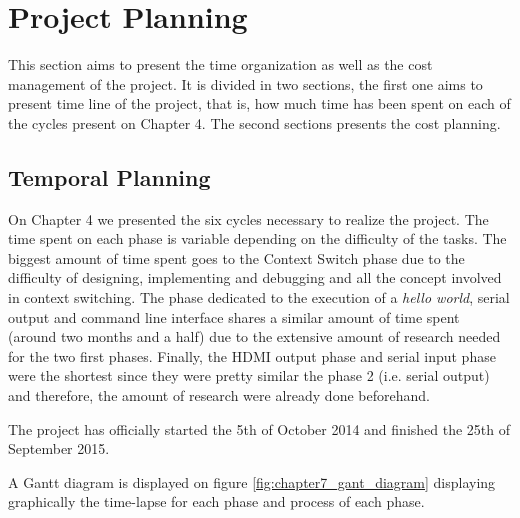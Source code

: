 \chapter{Project Planning}

This section aims to present the time organization as well as the cost management of the project. It is divided in two sections, the first one aims to present time line of the project, that is, how much time has been spent on each of the cycles present on Chapter 4. The second sections presents the cost planning.

\section{Temporal Planning}

On Chapter 4 we presented the six cycles necessary to realize the project. The time spent on each phase is variable depending on the difficulty of the tasks. The biggest amount of time spent goes to the Context Switch phase due to the difficulty of designing, implementing and debugging and all the concept involved in context switching. The phase dedicated to the  execution of a \textit{hello world}, serial output and command line interface shares a similar amount of time spent (around two months and a half) due to the extensive amount of research needed for the two first phases. Finally, the HDMI output phase and serial input phase were the shortest since they were pretty similar the phase 2 (i.e. serial output) and therefore, the amount of research were already done beforehand.

The project has officially started the 5th of October 2014 and finished the 25th of September 2015.

A Gantt diagram is displayed on figure \ref{fig:chapter7_gant_diagram} displaying graphically the time-lapse for each phase and process of each phase. 


